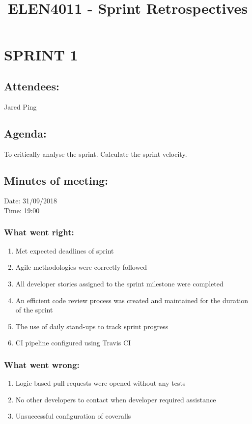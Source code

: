 \documentclass[10pt,onecolumn]{witseiepaper}
\title{ELEN4011 - Sprint Retrospectives}
\author{}
\begin{document}
\maketitle
\pagestyle{plain}
\setcounter{page}{1}

\section*{SPRINT 1}
\subsection*{Attendees:}
Jared Ping
\subsection*{Agenda:} 
To critically analyse the sprint. Calculate the sprint velocity.

\subsection*{Minutes of meeting:}
Date: 31/09/2018 \\
Time: 19:00

\subsubsection*{What went right:}
\begin{enumerate}
	\item Met expected deadlines of sprint
	\item Agile methodologies were correctly followed
	\item All developer stories assigned to the sprint milestone were completed
	\item An efficient code review process was created and maintained for the duration of the sprint
	\item The use of daily stand-ups to track sprint progress
	\item CI pipeline configured using Travis CI
\end{enumerate}

\subsubsection*{What went wrong:}
\begin{enumerate}
	\item Logic based pull requests were opened without any tests
	\item No other developers to contact when developer required assistance
	\item Unsuccessful configuration of coveralls
\end{enumerate}
\end{document}
